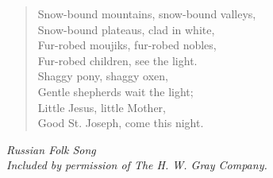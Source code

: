 
\begin{verse}
Snow-bound mountains, snow-bound valleys,\\
Snow-bound plateaus, clad in white,\\
Fur-robed moujiks, fur-robed nobles,\\
Fur-robed children, see the light.\\
Shaggy pony, shaggy oxen,\\
Gentle shepherds wait the light;\\
Little Jesus, little Mother,\\
Good St. Joseph, come this night.%
\end{verse}

\vspace{0.5\baselineskip}
\noindent\textit{Russian Folk Song}\\
\noindent\textit{Included by permission of The H. W. Gray Company.}

\newpage
